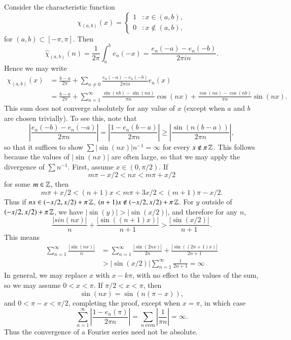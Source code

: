\begin{example}
    Consider the characteristic function
    \[ \chi_{(a,b)}(x) = \begin{cases} 1 & : x \in (a,b), \\ 0 & : x \not \in (a,b), \end{cases} \]
    for $(a,b) \subset [-\pi,\pi]$. Then
    \[ \widehat{\chi}_{(a,b)}(n) = \frac{1}{2\pi} \int_a^b e_n(-x) = \frac{e_n(-a) - e_n(-b)}{2\pi i n}. \]
    Hence we may write
    \begin{align*}
        \chi_{(a,b)}(x) &= \frac{b-a}{2\pi} + \sum_{n \neq 0} \frac{e_n(-a) - e_n(-b)}{2 \pi i n} e_n(x)\\
        &= \frac{b-a}{2\pi} + \sum_{n = 1}^\infty \frac{\sin(nb) - \sin(na)}{\pi n} \cos(nx) + \frac{\cos(na) - \cos(nb)}{\pi n} \sin(nx).
    \end{align*}
    This sum does not converge absolutely for any value of $x$ (except when $a$ and $b$ are chosen trivially). To see this, note that
    \[ \left|\frac{e_n(-b) - e_n(-a)}{2 \pi n}\right| = \left| \frac{1 - e_n(b-a)}{2 \pi n} \right| \geq \left| \frac{\sin(n(b-a))}{2 \pi n} \right|, \]
    so that it suffices to show $\sum |\sin(nx)| n^{-1} = \infty$ for every $x \not \in \pi \operatorname{\mathbb{Z}}$. This follows because the values of $|\sin(nx)|$ are often large, so that we may apply the divergence of $\sum n^{-1}$. First, assume $x \in (0,\pi/2)$. If
    \[ m \pi - x/2 < nx < m \pi + x/2 \]
    for some $m \in \operatorname{\mathbb{Z}}$, then
    \[ m \pi + x/2 < (n+1)x < m \pi + 3x/2 < (m+1) \pi - x/2. \]
    Thus if $nx \in (-x/2,x/2) + \pi \operatorname{\mathbb{Z}}$, $(n+1)x \not \in (-x/2,x/2) + \pi \operatorname{\mathbb{Z}}$. For $y$ outside of $(-x/2,x/2) + \pi \operatorname{\mathbb{Z}}$, we have $|\sin(y)| > |\sin(x/2)|$, and therefore for any $n$,
    \[ \frac{|sin(nx)|}{n} + \frac{|\sin((n+1)x)|}{n+1} > \frac{|\sin(x/2)|}{n+1}. \]
    This means
    \begin{align*}
        \sum_{n = 1}^\infty \frac{|\sin(nx)|}{n} &= \sum_{n = 1}^\infty \frac{|\sin(2nx)|}{2n} + \frac{|\sin((2n+1)x)|}{2n+1}\\
        &> |\sin(x/2)| \sum_{n = 1}^\infty \frac{1}{2n+1} = \infty
    \end{align*}
    In general, we may replace $x$ with $x - k \pi$, with no effect to the values of the sum, so we may assume $0 < x < \pi$. If $\pi/2 < x < \pi$, then
    \[ \sin(nx) = \sin(n(\pi - x)), \]
    and $0 < \pi - x < \pi/2$, completing the proof, except when $x = \pi$, in which case
    \[ \sum_{n = 1}^\infty \left| \frac{1 - e_n(\pi)}{2 \pi n} \right| = \sum_{n\ \text{even}} \left| \frac{1}{\pi n} \right| = \infty. \]
    Thus the convergence of a Fourier series need not be absolute.
\end{example}

